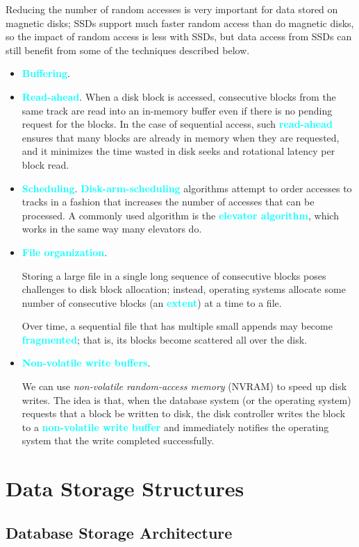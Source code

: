 \documentclass[a4paper,12pt,twoside,openany]{book}
\newcommand{\textcy}[1]{\textbf{\textcolor{cyan}{#1}}}
\begin{document}
Reducing the number of random accesses is very important for data stored on magnetic disks; SSDs support much faster random access than do magnetic disks, so the impact of random access is less with SSDs, but data access from SSDs can still benefit from some of the techniques described below.
\begin{itemize}
    \item \textcy{Buffering}.
    \item \textcy{Read-ahead}. When a disk block is accessed, consecutive blocks from the same track are read into an in-memory buffer even if there is no pending request for the blocks. In the case of sequential access, such \textcy{read-ahead} ensures that many blocks are already in memory when they are requested, and it minimizes the time wasted in disk seeks and rotational latency per block read.
    \item \textcy{Scheduling}. \textcy{Disk-arm-scheduling} algorithms attempt to order accesses to tracks in a fashion that increases the number of accesses that can be processed. A commonly used algorithm is the \textcy{elevator algorithm}, which works in the same way many elevators do.
    \item \textcy{File organization}.
    
    Storing a large file in a single long sequence of consecutive blocks poses challenges to disk block allocation; instead, operating systems allocate some number of consecutive blocks (an \textcy{extent}) at a time to a file.

    Over time, a sequential file that has multiple small appends may become \textcy{fragmented}; that is, its blocks become scattered all over the disk.
    \item \textcy{Non-volatile write buffers}.
    
    We can use \textit{non-volatile random-access memory} (NVRAM) to speed up disk writes. The idea is that, when the database system (or the operating system) requests that a block be written to disk, the disk controller writes the block to a \textcy{non-volatile write buffer} and immediately notifies the operating system that the write completed successfully. 
\end{itemize}

\chapter{Data Storage Structures}
\section{Database Storage Architecture}
\end{document}
